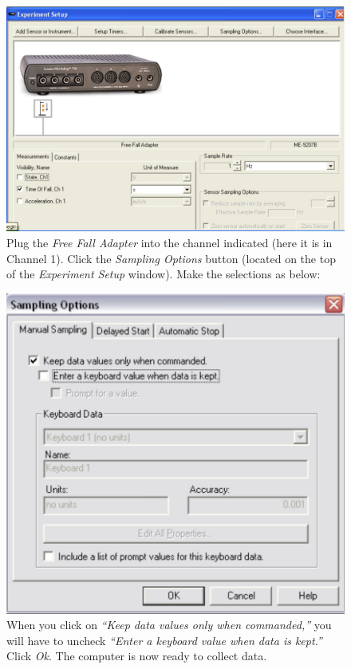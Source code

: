 \begin{figure}[hp]
  \centerline{\includegraphics[scale=0.3]{resources/photo4.jpg}}
  \caption{Plug the \emph{Free Fall Adapter} into the channel indicated (here it is in Channel 1).
Click the \emph{Sampling Options} button (located on the top of the \emph{Experiment Setup} window). Make the selections as below:}
\label{3.1}
\end{figure}


\begin{figure}[ht]
  \centerline{\includegraphics[scale=0.4]{resources/photo5.jpg}}
  \caption{When you click on \emph{“Keep data values only when commanded,”} you will have 
    to uncheck \emph{“Enter a keyboard value when data is kept.”} Click \emph{Ok}. The computer 
    is now ready to collect data.}
  \label{3.2}
\end{figure}

